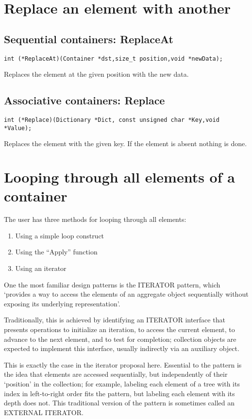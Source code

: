\documentclass[12pt,a4paper]{memoir} %
\begin{document}
\section{Replace an element with another}
\subsection{Sequential containers: ReplaceAt}
\begin{verbatim}
int (*ReplaceAt)(Container *dst,size_t position,void *newData);
\end{verbatim}
Replaces the element at the given position with the new data. 
\subsection{Associative containers: Replace}
\begin{verbatim}
int (*Replace)(Dictionary *Dict, const unsigned char *Key,void *Value);
\end{verbatim}
Replaces the element with the given key. If the element is absent nothing is done.
\section{Looping through all elements of a container}
The user has  three methods for looping through all elements:
\begin{enumerate}
\item Using a simple loop construct
\item Using the “Apply” function
\item Using an iterator
\end{enumerate}
One the most familiar design patterns  is the ITERATOR pattern, which ‘provides a way to access the elements of an aggregate object sequentially without exposing its underlying representation’. 

Traditionally, this is achieved by identifying an ITERATOR interface that presents operations to initialize an iteration, to access the current element, to advance to the next element, and to test for completion; collection objects are expected to implement this interface, usually indirectly via an auxiliary object. 

This is exactly the case in the iterator proposal here. Essential to the pattern is the idea that elements are accessed sequentially, but independently of their ‘position’ in the collection; for example, labeling each element of a tree with its index in left-to-right order fits the pattern, but labeling each element with its depth does not. This traditional version of the pattern is sometimes called an EXTERNAL ITERATOR. 
\end{document}
